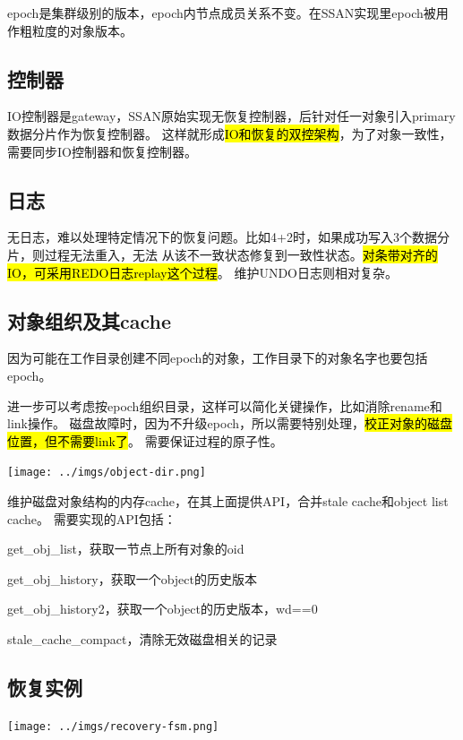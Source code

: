epoch是集群级别的版本，epoch内节点成员关系不变。在SSAN实现里epoch被用作粗粒度的对象版本。

\subsection{控制器}

IO控制器是gateway，SSAN原始实现无恢复控制器，后针对任一对象引入primary数据分片作为恢复控制器。
这样就形成\hl{IO和恢复的双控架构}，为了对象一致性，需要同步IO控制器和恢复控制器。

\subsection{日志}

无日志，难以处理特定情况下的恢复问题。比如4+2时，如果成功写入3个数据分片，则过程无法重入，无法
从该不一致状态修复到一致性状态。\hl{对条带对齐的IO，可采用REDO日志replay这个过程}。
维护UNDO日志则相对复杂。

\subsection{对象组织及其cache}
\label{subsec:object-dir}

因为可能在工作目录创建不同epoch的对象，工作目录下的对象名字也要包括epoch。

进一步可以考虑按epoch组织目录，这样可以简化关键操作，比如消除rename和link操作。
磁盘故障时，因为不升级epoch，所以需要特别处理，\hl{校正对象的磁盘位置，但不需要link了}。
需要保证过程的原子性。

\texttt{[image: ../imgs/object-dir.png]}

维护磁盘对象结构的内存cache，在其上面提供API，合并stale cache和object list cache。
需要实现的API包括：
\begin{enumbox}
\item get\_obj\_list，获取一节点上所有对象的oid
\item get\_obj\_history，获取一个object的历史版本
\item get\_obj\_history2，获取一个object的历史版本，wd==0
\item stale\_cache\_compact，清除无效磁盘相关的记录
\end{enumbox}

\subsection{恢复实例}

\texttt{[image: ../imgs/recovery-fsm.png]}

